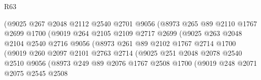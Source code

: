 \begin{lexlean}{R63}
\begin{coremodule}
                            (@9025
                              @267
                              @2048
                              @2112
                              @2540
                              @2701
                              @9056
                              (@8973
                                @265
                                @89
                                @2110
                                @1767
                                @2699
                                @1700
                                (@9019
                                  @264
                                  @2105
                                  @2109
                                  @2717
                                  @2699
                                  (@9025
                                    @263
                                    @2048
                                    @2104
                                    @2540
                                    @2716
                                    @9056
                                    (@8973
                                      @261
                                      @89
                                      @2102
                                      @1767
                                      @2714
                                      @1700
                                      (@9019
                                        @260
                                        @2097
                                        @2101
                                        @2763
                                        @2714
                                        (@9025
                                          @251
                                          @2048
                                          @2078
                                          @2540
                                          @2510
                                          @9056
                                          (@8973
                                            @249
                                            @89
                                            @2076
                                            @1767
                                            @2508
                                            @1700
                                            (@9019
                                              @248
                                              @2071
                                              @2075
                                              @2545
                                              @2508

\end{coremodule}
\end{lexlean}
